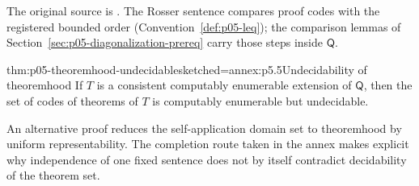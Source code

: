 The original source is \cite{Rosser1936}.  The Rosser sentence compares
proof codes with the registered bounded order
(Convention~\ref{def:p05-leq}); the comparison lemmas of
Section~\ref{sec:p05-diagonalization-prereq} carry those steps inside
\(\mathsf Q\).

\begin{hbcorollary}{thm:p05-theoremhood-undecidable}{sketched=annex:p5.5}{Undecidability of theoremhood}
If \(T\) is a consistent computably enumerable extension of
\(\mathsf Q\), then the set of codes of theorems of \(T\) is computably
enumerable but undecidable.
\end{hbcorollary}

An alternative proof reduces the self-application domain set to
theoremhood by uniform representability.  The completion route taken in
the annex makes explicit why independence of one fixed sentence does not
by itself contradict decidability of the theorem set.
